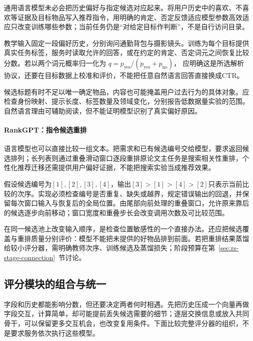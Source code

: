 通用语言模型未必会把历史偏好与指定候选对应起来。将用户历史中的喜欢、不喜欢等证据及目标物品写入推荐指令，用明确的肯定、否定反馈适应模型参数高效适应只改变训练哪些参数；当前任务仍是“对给定目标作判断”，不是自行访问目录。

教学输入固定一段偏好历史，分别询问通勤背包与摄影镜头。训练为每个目标提供真实任务标签，服务时读取允许的回答，或在约定的肯定、否定词元之间恢复比较分数。若以两个词元概率归一化为
$q=p_{\mathrm{yes}}/(p_{\mathrm{yes}}+p_{\mathrm{no}})$，
应明确这是所选解析协议，还要在目标数据上校准和评价，不能把任意自然语言回答直接换成CTR。

候选标题有时不足以唯一确定物品，内容也可能掩盖用户过去行为的具体对象。应检查身份映射、提示长度、标签数量及领域变化，分别报告低数据量实验的范围。自然语言理由可辅助阅读，但不能证明模型识别了真实偏好原因。

\paragraph{RankGPT：指令候选重排}
\label{sec:rs-rankgpt}

语言模型也可以直接比较一组文本。把需求和已有候选编号交给模型，要求返回候选排列；长列表则通过重叠滑动窗口逐段重排原论文主任务是搜索相关性重排，个性化推荐迁移还需提供用户偏好证据，不能把搜索实验当成推荐效果。

假设候选编号为$[1],[2],[3],[4]$，输出$[3]>[1]>[4]>[2]$只表示当前比较的次序。实现必须检查编号是否重复、缺失或越界，规定错误输出的回退，并保留每次窗口输入与恢复后的全局位置。由尾部向前处理的重叠窗口，允许原来靠后的候选逐步向前移动；窗口宽度和重叠步长会改变调用次数及可比较范围。

在同一候选池上改变输入顺序，是检查位置敏感性的一个直接办法。还应把候选覆盖与重排质量分别评价：模型不能把未提供的好物品排到前面。若把重排结果蒸馏给较小评分器，需明确教师次序、训练候选及蒸馏损失；阶段预算在第~\ref{sec:rs-stage-connection}~节讨论。

\subsection{评分模块的组合与统一}
\label{sec:rs-scoring-organization}

字段和历史都能影响分数，但还要决定两者何时相遇。先把历史压成一个向量再做字段交互，计算简单，却可能提前丢失候选需要的细节；逐层交换信息或放入共同骨干，可以保留更多交互机会，也改变复用条件。下面比较完整评分器的组织，不是要求服务依次执行这些模型。

